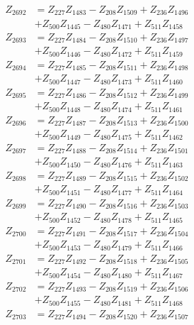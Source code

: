 \begin{multicols}{2}
\begin{align}
Z_{2692} &= Z_{227}Z_{1483} - Z_{208}Z_{1509} + Z_{236}Z_{1496}  \nonumber \\
&+ Z_{500}Z_{1445} - Z_{480}Z_{1471} + Z_{511}Z_{1458} \nonumber \\
Z_{2693} &= Z_{227}Z_{1484} - Z_{208}Z_{1510} + Z_{236}Z_{1497}  \nonumber \\
&+ Z_{500}Z_{1446} - Z_{480}Z_{1472} + Z_{511}Z_{1459} \nonumber \\
Z_{2694} &= Z_{227}Z_{1485} - Z_{208}Z_{1511} + Z_{236}Z_{1498}  \nonumber \\
&+ Z_{500}Z_{1447} - Z_{480}Z_{1473} + Z_{511}Z_{1460} \nonumber \\
Z_{2695} &= Z_{227}Z_{1486} - Z_{208}Z_{1512} + Z_{236}Z_{1499}  \nonumber \\
&+ Z_{500}Z_{1448} - Z_{480}Z_{1474} + Z_{511}Z_{1461} \nonumber \\
Z_{2696} &= Z_{227}Z_{1487} - Z_{208}Z_{1513} + Z_{236}Z_{1500}  \nonumber \\
&+ Z_{500}Z_{1449} - Z_{480}Z_{1475} + Z_{511}Z_{1462} \nonumber \\
Z_{2697} &= Z_{227}Z_{1488} - Z_{208}Z_{1514} + Z_{236}Z_{1501}  \nonumber \\
&+ Z_{500}Z_{1450} - Z_{480}Z_{1476} + Z_{511}Z_{1463} \nonumber \\
Z_{2698} &= Z_{227}Z_{1489} - Z_{208}Z_{1515} + Z_{236}Z_{1502}  \nonumber \\
&+ Z_{500}Z_{1451} - Z_{480}Z_{1477} + Z_{511}Z_{1464} \nonumber \\
Z_{2699} &= Z_{227}Z_{1490} - Z_{208}Z_{1516} + Z_{236}Z_{1503}  \nonumber \\
&+ Z_{500}Z_{1452} - Z_{480}Z_{1478} + Z_{511}Z_{1465} \nonumber \\
Z_{2700} &= Z_{227}Z_{1491} - Z_{208}Z_{1517} + Z_{236}Z_{1504}  \nonumber \\
&+ Z_{500}Z_{1453} - Z_{480}Z_{1479} + Z_{511}Z_{1466} \nonumber \\
Z_{2701} &= Z_{227}Z_{1492} - Z_{208}Z_{1518} + Z_{236}Z_{1505}  \nonumber \\
&+ Z_{500}Z_{1454} - Z_{480}Z_{1480} + Z_{511}Z_{1467} \nonumber \\
Z_{2702} &= Z_{227}Z_{1493} - Z_{208}Z_{1519} + Z_{236}Z_{1506}  \nonumber \\
&+ Z_{500}Z_{1455} - Z_{480}Z_{1481} + Z_{511}Z_{1468} \nonumber \\
Z_{2703} &= Z_{227}Z_{1494} - Z_{208}Z_{1520} + Z_{236}Z_{1507}  \nonumber \\

\end{align}
\end{multicols}
